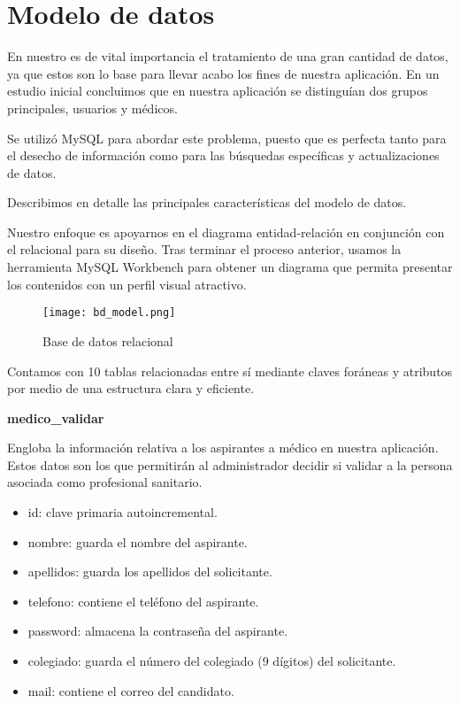 \documentclass[11pt,spanish,
		listoftables,listoffigures]
		{tfgplantilla}
\begin{document}
\chapter{Modelo de datos}

En nuestro es de vital importancia el tratamiento de una gran cantidad de datos, ya que estos son lo base para llevar acabo los fines de nuestra aplicación. En un estudio inicial concluimos que en nuestra aplicación se distinguían dos grupos principales, usuarios y médicos. 

Se utilizó MySQL para abordar este problema, puesto que es perfecta tanto para el desecho de información como para las búsquedas específicas y actualizaciones de datos.

Describimos en detalle las principales características del modelo de datos.

Nuestro enfoque es apoyarnos en el diagrama entidad-relación en conjunción con el relacional para su diseño. Tras terminar el proceso anterior, usamos la herramienta MySQL Workbench para obtener un diagrama que permita presentar los contenidos con un perfil visual atractivo.

\noindent
\begin{figure}[H]
\centering
\texttt{[image: bd\_model.png]}
\caption{Base de datos relacional}
\end{figure}

Contamos con 10 tablas relacionadas entre sí mediante claves foráneas y atributos por medio de una estructura clara y eficiente.

\noindent
\textbf {medico\_validar}

Engloba la información relativa a los aspirantes a médico en nuestra aplicación. Estos datos son los que permitirán al administrador decidir si validar a la persona asociada como profesional sanitario.
\begin{itemize}
	\item id: clave primaria autoincremental.
	\item nombre: guarda el nombre del aspirante.
	\item apellidos: guarda los apellidos del solicitante.
	\item telefono: contiene el teléfono del aspirante.
	\item password: almacena la contraseña del aspirante.
	\item colegiado: guarda el número del colegiado (9 dígitos) del solicitante.
	\item mail: contiene el correo del candidato.
\end{itemize}
\end{document}
